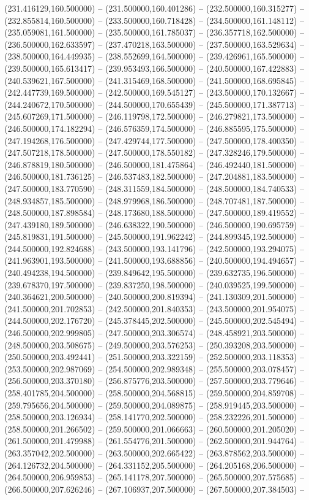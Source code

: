 (231.416129,160.500000) -- (231.500000,160.401286) -- (232.500000,160.315277) -- (232.855814,160.500000) -- (233.500000,160.718428) -- (234.500000,161.148112) -- (235.059081,161.500000) -- (235.500000,161.785037) -- (236.357718,162.500000) -- (236.500000,162.633597) -- (237.470218,163.500000) -- (237.500000,163.529634) -- (238.500000,164.449935) -- (238.552699,164.500000) -- (239.426961,165.500000) -- (239.500000,165.613417) -- (239.953493,166.500000) -- (240.500000,167.422883) -- (240.539621,167.500000) -- (241.315469,168.500000) -- (241.500000,168.695845) -- (242.447739,169.500000) -- (242.500000,169.545127) -- (243.500000,170.132667) -- (244.240672,170.500000) -- (244.500000,170.655439) -- (245.500000,171.387713) -- (245.607269,171.500000) -- (246.119798,172.500000) -- (246.279821,173.500000) -- (246.500000,174.182294) -- (246.576359,174.500000) -- (246.885595,175.500000) -- (247.194268,176.500000) -- (247.429744,177.500000) -- (247.500000,178.400350) -- (247.507218,178.500000) -- (247.500000,178.550182) -- (247.328246,179.500000) -- (246.878819,180.500000) -- (246.500000,181.475864) -- (246.492440,181.500000) -- (246.500000,181.736125) -- (246.537483,182.500000) -- (247.204881,183.500000) -- (247.500000,183.770590) -- (248.311559,184.500000) -- (248.500000,184.740533) -- (248.934857,185.500000) -- (248.979968,186.500000) -- (248.707481,187.500000) -- (248.500000,187.898584) -- (248.173680,188.500000) -- (247.500000,189.419552) -- (247.439180,189.500000) -- (246.638322,190.500000) -- (246.500000,190.695759) -- (245.819831,191.500000) -- (245.500000,191.962242) -- (244.899345,192.500000) -- (244.500000,192.824688) -- (243.500000,193.141796) -- (242.500000,193.294075) -- (241.963901,193.500000) -- (241.500000,193.688856) -- (240.500000,194.494657) -- (240.494238,194.500000) -- (239.849642,195.500000) -- (239.632735,196.500000) -- (239.678370,197.500000) -- (239.837250,198.500000) -- (240.039525,199.500000) -- (240.364621,200.500000) -- (240.500000,200.819394) -- (241.130309,201.500000) -- (241.500000,201.702853) -- (242.500000,201.840353) -- (243.500000,201.954075) -- (244.500000,202.176720) -- (245.378445,202.500000) -- (245.500000,202.545494) -- (246.500000,202.999805) -- (247.500000,203.306574) -- (248.458921,203.500000) -- (248.500000,203.508675) -- (249.500000,203.576253) -- (250.393208,203.500000) -- (250.500000,203.492441) -- (251.500000,203.322159) -- (252.500000,203.118353) -- (253.500000,202.987069) -- (254.500000,202.989348) -- (255.500000,203.078457) -- (256.500000,203.370180) -- (256.875776,203.500000) -- (257.500000,203.779646) -- (258.401785,204.500000) -- (258.500000,204.568815) -- (259.500000,204.859708) -- (259.795656,204.500000) -- (259.500000,204.089875) -- (258.919445,203.500000) -- (258.500000,203.126934) -- (258.141770,202.500000) -- (258.232226,201.500000) -- (258.500000,201.266502) -- (259.500000,201.066663) -- (260.500000,201.205020) -- (261.500000,201.479988) -- (261.554776,201.500000) -- (262.500000,201.944764) -- (263.357042,202.500000) -- (263.500000,202.665422) -- (263.878562,203.500000) -- (264.126732,204.500000) -- (264.331152,205.500000) -- (264.205168,206.500000) -- (264.500000,206.959853) -- (265.141178,207.500000) -- (265.500000,207.575685) -- (266.500000,207.626246) -- (267.106937,207.500000) -- (267.500000,207.384503) -- 